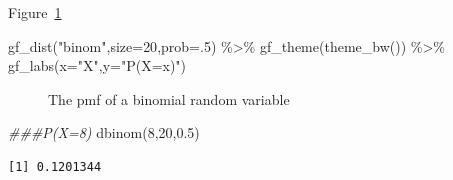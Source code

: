 \documentclass[
  letterpaper,
  DIV=11,
  numbers=noendperiod]{scrreprt}
\newenvironment{Shaded}{\begin{snugshade}}{\end{snugshade}}
\newcommand{\AttributeTok}[1]{\textcolor[rgb]{0.40,0.45,0.13}{#1}}
\newcommand{\DecValTok}[1]{\textcolor[rgb]{0.68,0.00,0.00}{#1}}
\newcommand{\DocumentationTok}[1]{\textcolor[rgb]{0.37,0.37,0.37}{\textit{#1}}}
\newcommand{\FloatTok}[1]{\textcolor[rgb]{0.68,0.00,0.00}{#1}}
\newcommand{\FunctionTok}[1]{\textcolor[rgb]{0.28,0.35,0.67}{#1}}
\newcommand{\NormalTok}[1]{\textcolor[rgb]{0.00,0.23,0.31}{#1}}
\newcommand{\SpecialCharTok}[1]{\textcolor[rgb]{0.37,0.37,0.37}{#1}}
\newcommand{\StringTok}[1]{\textcolor[rgb]{0.13,0.47,0.30}{#1}}
\begin{document}
Figure~\ref{fig-binom}

\begin{Shaded}
\begin{Highlighting}[]
\FunctionTok{gf\_dist}\NormalTok{(}\StringTok{"binom"}\NormalTok{,}\AttributeTok{size=}\DecValTok{20}\NormalTok{,}\AttributeTok{prob=}\NormalTok{.}\DecValTok{5}\NormalTok{) }\SpecialCharTok{\%\textgreater{}\%}
  \FunctionTok{gf\_theme}\NormalTok{(}\FunctionTok{theme\_bw}\NormalTok{()) }\SpecialCharTok{\%\textgreater{}\%}
  \FunctionTok{gf\_labs}\NormalTok{(}\AttributeTok{x=}\StringTok{"X"}\NormalTok{,}\AttributeTok{y=}\StringTok{"P(X=x)"}\NormalTok{)}
\end{Highlighting}
\end{Shaded}

\begin{figure}[H]


\caption{\label{fig-binom}The pmf of a binomial random variable}

\end{figure}%

\begin{Shaded}
\begin{Highlighting}[]
\DocumentationTok{\#\#\#P(X=8)}
\FunctionTok{dbinom}\NormalTok{(}\DecValTok{8}\NormalTok{,}\DecValTok{20}\NormalTok{,}\FloatTok{0.5}\NormalTok{)}
\end{Highlighting}
\end{Shaded}

\begin{verbatim}
[1] 0.1201344
\end{verbatim}
\end{document}
